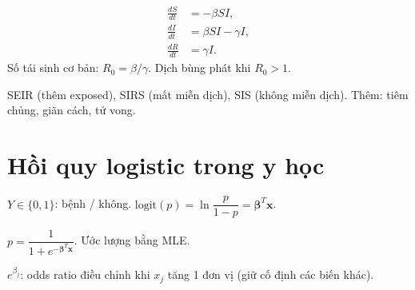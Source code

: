 \documentclass[12pt,a4paper]{article}
\begin{document}
\begin{dinhnghia}[title={Mô hình SIR}]
  \begin{align*}
    \frac{dS}{dt} &= -\beta SI, \\
    \frac{dI}{dt} &= \beta SI - \gamma I, \\
    \frac{dR}{dt} &= \gamma I.
  \end{align*}
  Số tái sinh cơ bản: $R_0 = \beta/\gamma$. Dịch bùng phát khi $R_0 > 1$.
\end{dinhnghia}

\begin{tinhchat}[title={Mở rộng}]
  SEIR (thêm exposed), SIRS (mất miễn dịch), SIS (không miễn dịch). Thêm: tiêm chủng, giãn cách, tử vong.
\end{tinhchat}

\section{Hồi quy logistic trong y học}

\begin{dinhnghia}[title={Mô hình}]
  $Y \in \{0, 1\}$: bệnh / không. $\text{logit}(p) = \ln\dfrac{p}{1-p} = \boldsymbol{\beta}^T\mathbf{x}$.

  $p = \dfrac{1}{1 + e^{-\boldsymbol{\beta}^T\mathbf{x}}}$. Ước lượng bằng MLE.
\end{dinhnghia}

\begin{tinhchat}[title={Diễn giải}]
  $e^{\beta_j}$: odds ratio điều chỉnh khi $x_j$ tăng 1 đơn vị (giữ cố định các biến khác).
\end{tinhchat}
\end{document}
